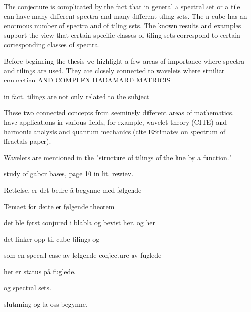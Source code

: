 \documentclass[../thesis.tex]{subfiles}
\begin{document}
The conjecture is complicated by the fact that in general a spectral set or a tile can have many different spectra and many different tiling sets. The n-cube has an enormous number of spectra and of tiling sets. The known results and examples support the view that certain specific classes of tiling sets correspond to certain corresponding classes of spectra.

Before beginning the thesis we highlight a few areas of importance where spectra and tilings are used. 
They are closely connected to wavelets where similiar connection AND COMPLEX HADAMARD MATRICIS. 

in fact, tilings are not only related to the subject 



These two connected concepts from seemingly different areas of mathematics, have applications in various fields, for example, wavelet theory (CITE) and harmonic analysis and quantum mechanics (cite EStimates on spectrum of ffractals paper).  


Wavelets are mentioned in the "structure of tilings of the line by a function."

study of gabor bases, page 10 in lit. rewiev. 

Rettelse, er det bedre å begynne med følgende

Temaet for dette er følgende theorem

det ble først conjured i blabla og bevist her. og her 


det linker opp til cube tilings og 


som en specail case av følgende conjecture av fuglede.

her er status på fuglede. 

og spectral sets. 


slutnning og la oss begynne. 
\end{document}

